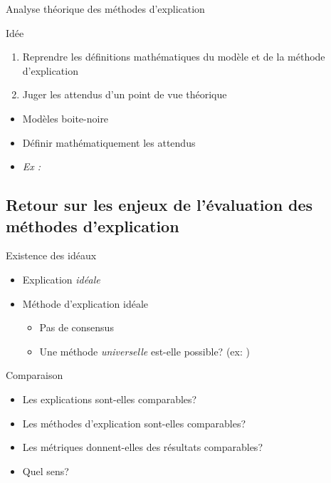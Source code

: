\documentclass[french, 12pt, aspectratio=2013]{beamer}
\begin{document}
    \begin{frame}{Analyse théorique des méthodes d'explication}
        \begin{block}{Idée}
            \begin{enumerate}
                \item Reprendre les définitions mathématiques du modèle et de la méthode d'explication
                \item Juger les attendus d'un point de vue théorique
            \end{enumerate}
        \end{block}
        \begin{itemize}
            \item Modèles boite-noire
            \item Définir mathématiquement les attendus
            \item \textit{Ex : \cite{lopardo_attention_2024}}
        \end{itemize}
    \end{frame}
    
    \subsection{Retour sur les enjeux de l'évaluation des méthodes d'explication}
        \begin{frame}{Existence des idéaux}
            \begin{itemize}
                \item Explication \emph{idéale}
                \item Méthode d'explication idéale
                \begin{itemize}
                    \item Pas de consensus \cite{garouani_investigating_2024}
                    \item Une méthode \emph{universelle} est-elle possible? (ex: \cite{mersha_evaluating_2025})
                \end{itemize}
            \end{itemize}
        \end{frame}
        
        \begin{frame}{Comparaison}
            \begin{itemize}
                \item Les explications sont-elles comparables? \item Les méthodes d'explication sont-elles comparables?
                \item Les métriques donnent-elles des résultats comparables?
                \item Quel sens?
            \end{itemize}
        \end{frame}
        
\end{document}
